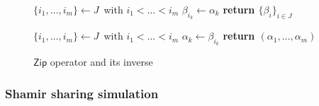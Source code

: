 \documentclass[psamsfonts, reqno]{amsart}
\theoremstyle{definition}
\theoremstyle{remark}
\numberwithin{equation}{section}
\begin{document}
\vspace{-0pt}
\begin{figure}[H]
\begin{minipage}{0.48\textwidth}
\begin{algorithm}[H]
    \centering
    \caption{$\mathsf{Zip}\hspace{1pt}
    (\alpha_1, \dots, \alpha_m;
    \hspace{2pt} J\hspace{1pt})$}\label{zip_def}
    \begin{algorithmic}
    	\vspace{2pt}
    	\State
			$\{i_1, \dots, i_m\} \leftarrow J$\ with
			$i_1 < \dots < i_m$\vspace{3pt}
    	\vspace{2pt}
			\State
    			$\beta_{i_k} \leftarrow \alpha_k$\vspace{2pt}
		\EndFor
        \State \textbf{return $\{\beta_i\}_{i \in J}$}
    \end{algorithmic}
\end{algorithm}\vspace{0pt}
\end{minipage}
\hfill
\begin{minipage}{0.48\textwidth}
\begin{algorithm}[H]
    \centering
    \caption{$\mathsf{Zip}^{-1}\hspace{1pt}
    (\hspace{1pt}\{\beta_i\}_{i \in J})$}\label{zip_def}
    \begin{algorithmic}
    	\vspace{2pt}
    	\State
			$\{i_1, \dots, i_m\} \leftarrow J$\ with
			$i_1 < \dots < i_m$\vspace{3pt}
    	\vspace{2pt}
			\State
    			$\alpha_k \leftarrow \beta_{i_k}$\vspace{2pt}
		\EndFor
        \State \textbf{return $(\alpha_1, \dots, \alpha_m)$}
    \end{algorithmic}
\end{algorithm}\vspace{0pt}
\end{minipage}
\vspace{-12pt}
\caption{$\mathsf{Zip}$ operator and its inverse}
\label{fig_zip_operator}
\end{figure}

\subsubsection{Shamir sharing simulation}\label{section_shamir_sharing_simulation}
\end{document}
